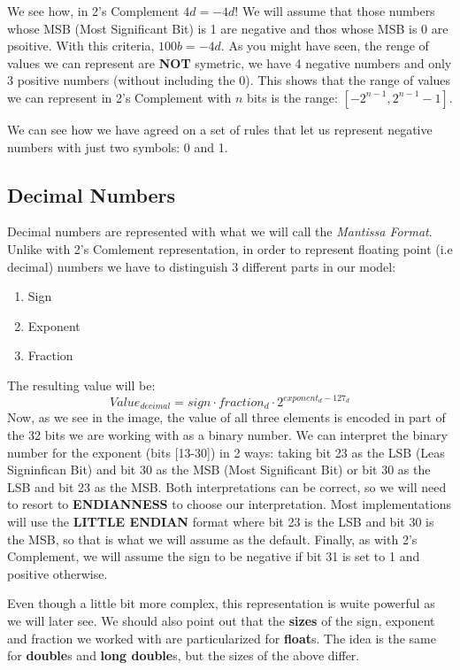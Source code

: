 \documentclass[12pt]{book}
\begin{document}
We see how, in 2's Complement $4d = -4d!$ We will assume that those numbers whose MSB (Most Significant Bit) is 1 are negative and thos whose MSB is 0 are psoitive. With this criteria, $100b = -4d$. As you might have seen, the renge of values we can represent are \textbf{NOT} symetric, we have 4 negative numbers and only 3 positive numbers (without including the 0). This shows that the range of values we can represent in 2's Complement with $n$ bits is the range: $[-2^{n-1}, 2^{n-1} - 1]$.

We can see how we have agreed on a set of rules that let us represent negative numbers with just two symbols: 0 and 1.

\subsection{Decimal Numbers} %

Decimal numbers are represented with what we will call the \textit{Mantissa Format}. Unlike with 2's Comlement representation, in order to represent floating point (i.e decimal) numbers we have to distinguish 3 different parts in our model:

\begin{enumerate}
  \item Sign
  \item Exponent
  \item Fraction
\end{enumerate}

The resulting value will be: $$Value_{decimal} = sign \cdot fraction_d \cdot 2^{exponent_d - 127_d}$$ Now, as we see in the image, the value of all three elements is encoded in part of the 32 bits we are working with as a binary number. We can interpret the binary number for the exponent (bits [13-30]) in 2 ways: taking bit 23 as the LSB (Leas Signinfican Bit) and bit 30 as the MSB (Most Significant Bit) or bit 30 as the LSB and bit 23 as the MSB. Both interpretations can be correct, so we will need to resort to \textbf{ENDIANNESS} to choose our interpretation. Most implementations will use the \textbf{LITTLE ENDIAN} format where bit 23 is the LSB and bit 30 is the MSB, so that is what we will assume as the default. Finally, as with 2's Complement, we will assume the sign to be negative if bit 31 is set to 1 and positive otherwise.

Even though a little bit more complex, this representation is wuite powerful as we will later see. We should also point out that the \textbf{sizes} of the sign, exponent and fraction we worked with are particularized for \textbf{float}s. The idea is the same for \textbf{double}s and \textbf{long double}s, but the sizes of the above differ.
\end{document}
